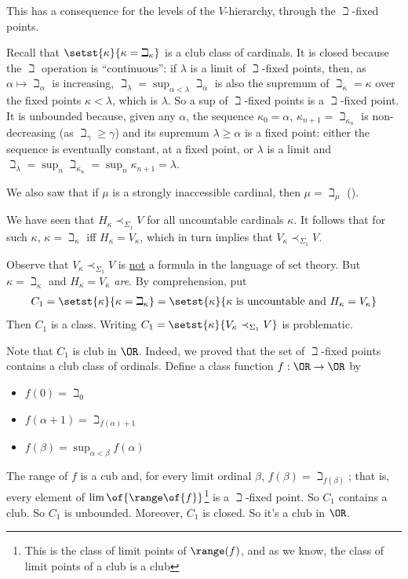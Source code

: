 This has a consequence for the levels of the $V$-hierarchy, through the $\beth$-fixed points.

Recall that $\setst{\kappa}{\kappa = \beth_{\kappa}}$ is a club class of cardinals. It is closed because the $\beth$ operation is ``continuous'': if $\lambda$ is a limit of $\beth$-fixed points, then, as $\alpha \mapsto \beth_{\alpha}$ is increasing, $\beth_{\lambda} = \sup_{\alpha < \lambda} \beth_{\alpha}$ is also the supremum of $\beth_{\kappa} = \kappa$ over the fixed points $\kappa < \lambda$, which is $\lambda$. So a sup of $\beth$-fixed points is a $\beth$-fixed point. It is unbounded because, given any $\alpha$, the sequence $\kappa_0 = \alpha$, $\kappa_{n + 1} = \beth_{\kappa_n}$ is non-decreasing (as $\beth_{\gamma} \geq \gamma$) and its supremum $\lambda \geq \alpha$ is a fixed point: either the sequence is eventually constant, at a fixed point, or $\lambda$ is a limit and $\beth_{\lambda} = \sup_{n} \beth_{\kappa_n} = \sup_n \kappa_{n + 1} = \lambda$.

We also saw that if $\mu$ is a strongly inaccessible cardinal, then $\mu = \beth_{\mu}$ ().

We have seen that $H_{\kappa} \prec_{\Sigma_1} V$ for all uncountable cardinals $\kappa$. It follows that for such $\kappa$, $\kappa = \beth_{\kappa}$ iff $H_{\kappa} = V_{\kappa}$, which in turn implies that $V_{\kappa} \prec_{\Sigma_1} V$.

Observe that $V_{\kappa} \prec_{\Sigma_1} V$ is \underline{not} a formula in the language of set theory. But $\kappa = \beth_{\kappa}$ and $H_{\kappa} = V_{\kappa}$ \textit{are}. By comprehension, put
\begin{align*}
    C_1 = \setst{\kappa}{\kappa = \beth_{\kappa}} = \setst{\kappa}{\kappa \text{ is uncountable and } H_{\kappa} = V_{\kappa}}
\end{align*}
Then $C_1$ is a class. Writing $C_1 = \setst{\kappa}{V_{\kappa} \prec_{\Sigma_1} V}$ is problematic.

Note that $C_1$ is club in $\OR$. Indeed, we proved that the set of $\beth$-fixed points contains a club class of ordinals. Define a class function $f : \OR \to \OR$ by
\begin{itemize}
    \item $f(0) = \beth_0$
    \item $f(\alpha + 1) = \beth_{f(\alpha) + 1}$
    \item $f(\beta) = \sup_{\alpha < \beta} f(\alpha)$
\end{itemize}
The range of $f$ is a cub and, for every limit ordinal $\beta$, $f(\beta) = \beth_{f(\beta)}$; that is, every element of $\lim\of{\range\of{f}}$\footnote{This is the class of limit points of $\range(f)$, and as we know, the class of limit points of a club is a club} is a $\beth$-fixed point. So $C_1$ contains a club. So $C_1$ is unbounded. Moreover, $C_1$ is closed. So it's a club in $\OR$.
